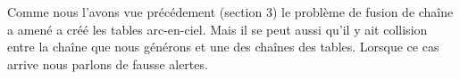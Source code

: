 	Comme nous l'avons vue précédement (section 3) le problème de fusion de chaîne a amené a créé les tables arc-en-ciel. Mais il se peut aussi qu'il y ait collision entre la chaîne que nous générons et une des chaînes des tables. Lorsque ce cas arrive nous parlons de fausse alertes.


	



\endinput{}

